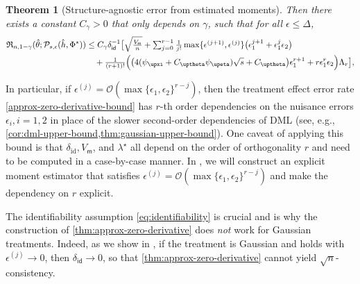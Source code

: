 \documentclass{article}
\def\eps{{\epsilon}}
\def\gO{{\mathcal{O}}}
\def\gP{{\mathcal{P}}}
\newcommand{\textfrac}[2]{{\textstyle\frac{#1}{#2}}}
\newtheorem{theorem}{Theorem}[section]
\begin{document}
\begin{theorem}[Structure-agnostic error from estimated moments]
    Then there exists a constant $C_{\gamma}>0$ that only depends on $\gamma$, such that for all $\eps \leq \Delta$,
    \begin{equation}
        \label{approx-zero-derivative-bound}
        \begin{aligned}
            \mathfrak{R}_{n,1-\gamma}  (\hat{\theta};\gP_{s,\eps}(\hat{h},\Phi^{\star})) 
            &\leq C_{\gamma} \delta_{\mathsf{id}}^{-1}
            \big[\sqrt{\textfrac{V_{\mathsf{m}}}{n}} +  \textstyle\sum_{j=0}^{r-1} \textfrac{1}{j!}\max\{\eps^{(j+1)},\eps^{(j)}\}\big(\eps_1^{j+1}+\eps_1^{j}\eps_2\big) \\
            &\quad + \textfrac{1}{(r+1)!}  \Bigl(\big(4(\psi_{\upxi}+C_{\uptheta}\psi_{\upeta})\sqrt{s} + C_{\uptheta}\big)\eps_1^{r+1}
             +r\eps_1^r\eps_2\Bigr)\Lambda_r\big],
        \end{aligned}
    \end{equation}
\end{theorem}

%
%

%

In particular, if $\eps^{(j)} = \gO(\max\{\eps_1,\eps_2\}^{r-j})$, then the treatment effect error rate \cref{approx-zero-derivative-bound} has $r$-th order dependencies on the nuisance errors $\eps_i,i=1,2$ in place of the slower second-order dependencies of DML (see, e.g.,  \cref{cor:dml-upper-bound,thm:gaussian-upper-bound}). One caveat of applying this bound is that $\delta_{\mathrm{id}}, V_{\mathsf{m}}$, and $\lambda^{\star}$ all depend on the order of orthogonality $r$ and need to be computed in a case-by-case manner. In , we will construct an explicit moment estimator that satisfies $\eps^{(j)} = \gO(\max\{\eps_1,\eps_2\}^{r-j})$ and make the dependency on $r$ explicit.

The identifiability assumption \cref{eq:identifiability} is crucial and is why the construction of \cref{thm:approx-zero-derivative} does \emph{not} work for Gaussian treatments. Indeed, as we show in , if the treatment is Gaussian and  holds with $\eps^{(j)}\to 0$, then $\delta_{\mathsf{id}}\to 0$, so that \cref{thm:approx-zero-derivative} cannot yield $\sqrt{n}$-consistency.
\end{document}

